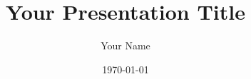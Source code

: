 \documentclass[aspectratio=169]{beamer}
\title{Your Presentation Title}
\author{Your Name}
\institute{EPFL, Switzerland}
\date{\today}
\begin{document}
\begin{frame}
    \titlepage
\end{frame}




\end{document}
